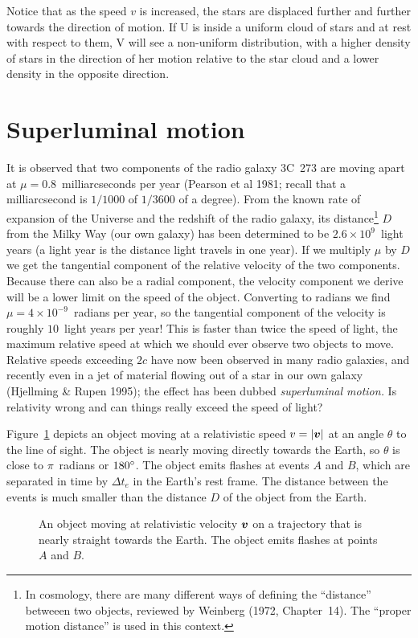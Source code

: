 Notice that as the speed $v$ is increased, the stars are displaced
further and further towards the direction of motion.  If U is inside a
uniform cloud of stars and at rest with respect to them, V will see a
non-uniform distribution, with a higher density of stars in the
direction of her motion relative to the star cloud and a lower density
in the opposite direction.


\section{Superluminal motion}
\label{sec:superluminal}

It is observed that two components of the radio galaxy 3C~273 are
moving apart at $\mu=0.8$~milliarcseconds per year (Pearson et al
1981; recall that a milliarcsecond is $1/1000$ of $1/3600$ of a
degree).  From the known rate of expansion of the Universe and the
redshift of the radio galaxy, its distance\footnote{In cosmology,
there are many different ways of defining the ``distance'' betweeen
two objects, reviewed by Weinberg (1972, Chapter~14).  The ``proper
motion distance'' is used in this context.} $D$ from the Milky Way
(our own galaxy) has been determined to be $2.6\times 10^{9}$~light
years (a light year is the distance light travels in one year).  If we
multiply $\mu$ by $D$ we get the tangential component of the relative
velocity of the two components.  Because there can also be a radial
component, the velocity component we derive will be a lower limit on
the speed of the object.  Converting to radians we find $\mu=4\times
10^{-9}$~radians per year, so the tangential component of the velocity
is roughly $10$~light years per year!  This is faster than twice the
speed of light, the maximum relative speed at which we should ever
observe two objects to move.  Relative speeds exceeding $2c$ have now
been observed in many radio galaxies, and recently even in a jet of
material flowing out of a star in our own galaxy (Hjellming \& Rupen
1995); the effect has been dubbed {\em superluminal motion.\/} Is
relativity wrong and can things really exceed the speed of light?

Figure~\ref{fig:slm} depicts an object moving at a relativistic speed
$v=|\mbox{\boldmath $v$}|$ at an angle $\theta$ to the line of sight.  The object is
nearly moving directly towards the Earth, so $\theta$ is close to
$\pi$~radians or $180^{\circ}$.  The object emits flashes at events
$A$ and $B$, which are separated in time by $\Delta t_e$ in the
Earth's rest frame.  The distance between the events is much smaller
than the distance $D$ of the object from the Earth.
\begin{figure}
\caption[Object moving quickly, nearly towards the Earth.]{An object
moving at relativistic velocity $\mbox{\boldmath $v$}$ on a trajectory that is
nearly straight towards the Earth.  The object emits flashes at points
$A$ and $B$.}
\label{fig:slm}
\end{figure}

